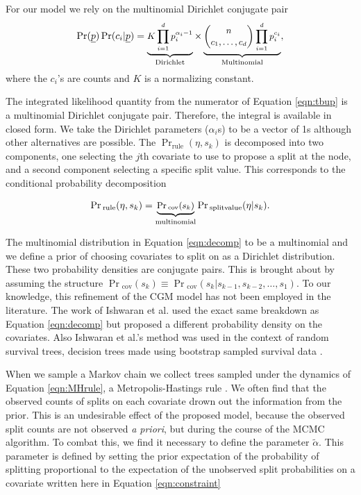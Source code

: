 For our model we rely on the multinomial Dirichlet conjugate pair 
\begin{equation}
\small{\Pr(\underline{p})\Pr(c_i\vert \underline{p}) = \underbrace{K\prod_{i=1}^dp_i^{\alpha_i-1}}_\text{Dirichlet} \times \underbrace{{n \choose c_1,\dots ,c_d}\prod_{i=1}^dp_i^{c_i}}_\text{Multinomial}},\nonumber
\end{equation}    
where the $c_i$'s are  counts and $K$ is a normalizing constant. 

  The integrated likelihood quantity from the numerator of Equation \ref{eqn:tbup} is a multinomial Dirichlet conjugate pair. Therefore, the integral is available in closed form. We take the Dirichlet parameters ($\alpha_i$s) to be a vector of 1s although other alternatives are possible. The $\Pr_{\text{rule}}(\eta, s_k)$ is decomposed into two components, one selecting the $j$th covariate to use to propose a split at the node, and a second component selecting a specific split value. This corresponds to the conditional probability decomposition 

\begin{equation}\label{eqn:decomp}
\small{\Pr{_\text{rule}}(\eta,s_k) = \underbrace{\Pr{_\text{cov}}(s_k)}_{\text{multinomial}}\Pr{_\text{splitvalue}}(\eta \vert s_k)}.
\end{equation} 

The multinomial distribution in Equation \ref{eqn:decomp} to be a multinomial and we define a prior of choosing covariates to split on as a Dirichlet distribution. These two probability densities are conjugate pairs. This is brought about by assuming the structure $ \Pr{_\text{cov}}(s_k)\equiv\Pr{_\text{cov}}(s_k \vert s_{k-1}, s_{k-2},\dots, s_{1})$. To our knowledge, this refinement of the CGM model has not been employed in the literature. The work of Ishwaran et al. used the exact same breakdown as Equation \ref{eqn:decomp} but proposed a different probability density on the covariates. Also Ishwaran et al.'s method was used in the context of random survival trees, decision trees made using bootstrap sampled survival data \cite{ishwaran2010high}. 

When we sample a Markov chain we collect trees sampled under the dynamics of Equation \ref{eqn:MHrule}, a Metropolis-Hastings rule \cite{robert1999monte}. We often find that the observed counts of splits on each covariate drown out the information from the prior. This is an undesirable effect of the proposed model, because the observed split counts are not observed \emph{a priori}, but during the course of the MCMC algorithm. To combat this, we find it necessary to define the parameter $\widetilde{\alpha}$. This parameter is defined by setting the prior expectation of the probability of splitting proportional to the expectation of the unobserved split probabilities on a covariate written here in Equation \ref{eqn:constraint}

